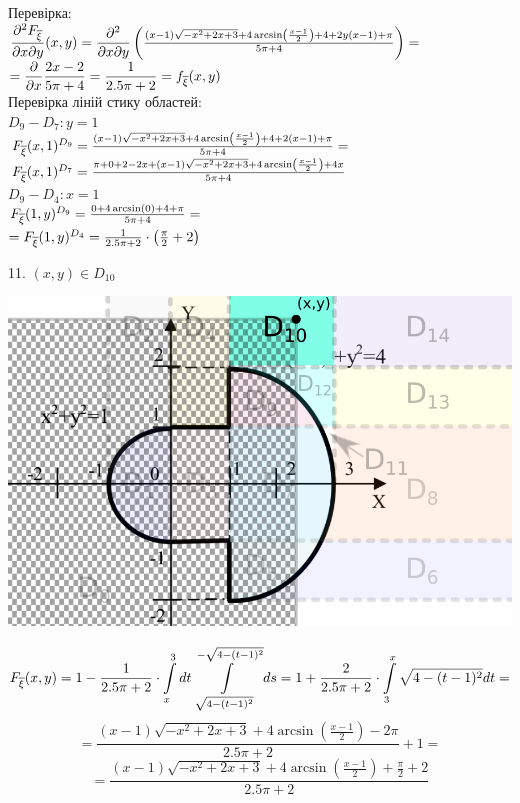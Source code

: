 \documentclass[14pt,a4paper]{scrartcl}
\theoremstyle{definition}
\theoremstyle{remark}
\theoremstyle{definition}
\theoremstyle{definition}
\begin{document}
Перевірка:\\
$\dfrac{\partial^2 F_{\overline{\xi}}}{\partial x \partial y}(x,y) =
\dfrac{\partial^2}{\partial x \partial y} \left( \frac{\left(x-1\right)\sqrt{-x^2+2x+3}+4\arcsin\left(\frac{x-1}{2}\right)+4 +2y(x-1) +\pi}{5\pi + 4}
\right) =$\\
$= \dfrac{\partial}{ \partial x} \dfrac{2x-2}{5\pi + 4} = \dfrac{1}{2.5\pi + 2}=f_{\overline{\xi}} (x,y)$\\

Перевірка ліній стику областей:\\
$D_9 - D_7: y = 1$\\
$ F_{\overline{\xi}} (x,1)^{D_9} =  \frac{\left(x-1\right)\sqrt{-x^2+2x+3}+4\arcsin\left(\frac{x-1}{2}\right)+4 +2(x-1) +\pi}{5\pi + 4} =$\\
$ F_{\overline{\xi}} (x,1)^{D_7} = \frac{\pi+ 0 + 2-2x+\left(x-1\right)\sqrt{-x^2+2x+3}+4\arcsin\left(\frac{x-1}{2}\right)+ 4x}{5\pi + 4}$\\
$D_9 - D_4 : x = 1$\\
$ F_{\overline{\xi}} (1,y)^{D_9} = \frac{0+4\arcsin(0)+4 +\pi}{5\pi + 4} =$\\
$= F_{\overline{\xi}} (1,y)^{D_4} = \frac{1}{2.5\pi + 2} \cdot \left( \frac{\pi}{2} + 2 \right)$
\newpage

11. $(x,y) \in D_{10}$
\begin{center} \includegraphics[scale=0.4]{assets/1110.png} \end{center}
$$
F_{\overline{\xi}} (x,y) =  1 -   \frac{1}{2.5\pi + 2} \cdot \int\limits_{x}^{ 3}{ dt  \int\limits_{\sqrt{4 - (t-1)^2}}^{ - \sqrt{4 - (t-1)^2}}{ds}}=   1 + \frac{2}{2.5\pi + 2} \cdot  \int\limits_{3}^{ x}{\sqrt{4 - (t-1)^2}dt} =
$$
$$
= \dfrac{\left(x-1\right)\sqrt{-x^2+2x+3}+4\arcsin\left(\frac{x-1}{2}\right)-2{\pi}}{2.5\pi + 2}+ 1  =
$$
$$
= \dfrac{\left(x-1\right)\sqrt{-x^2+2x+3}+4\arcsin\left(\frac{x-1}{2}\right) + \frac{\pi}{2} + 2 }{2.5\pi + 2}
$$
\end{document}
